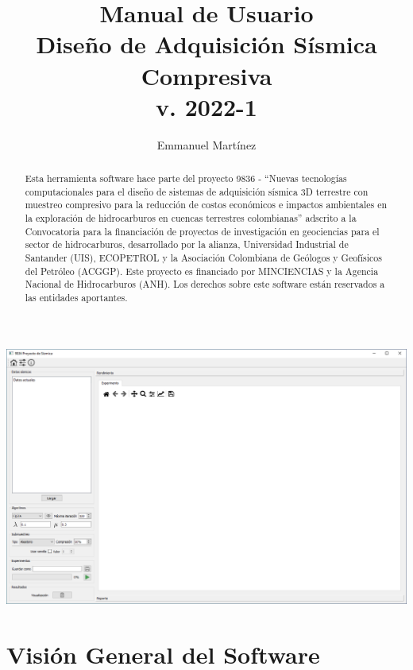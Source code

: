 \documentclass[12pt,oneside,a4]{article}
\title{\large{Manual de Usuario}\\ \huge{Diseño de Adquisición Sísmica Compresiva}\\ \vspace{2mm} \small{v. 2022-1}}
\author{Emmanuel Martínez}
\begin{document}
\maketitle
\begin{center}
\includegraphics[width=.9\linewidth]{header.png}
\end{center}
\begin{abstract}
Esta herramienta software hace parte del proyecto 9836 - ``Nuevas tecnologías computacionales para el diseño de sistemas de adquisición sísmica 3D terrestre con muestreo compresivo para la reducción de costos económicos e impactos ambientales en la exploración de hidrocarburos en cuencas terrestres colombianas'' adscrito a la Convocatoria para la financiación de proyectos de investigación en geociencias para el sector de hidrocarburos, desarrollado por la alianza, Universidad Industrial de Santander (UIS), ECOPETROL y la Asociación Colombiana de Geólogos y Geofísicos del Petróleo (ACGGP). Este proyecto es financiado por MINCIENCIAS y la Agencia Nacional de Hidrocarburos (ANH). Los derechos sobre este software están reservados a las entidades aportantes.
\end{abstract}

\clearpage
\tableofcontents

\clearpage

\section{Visión General del Software}
\end{document}

